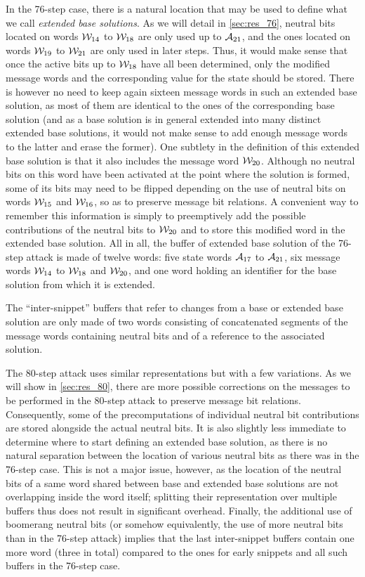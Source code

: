 In the 76-step case, there is a natural location that may be used to define what we call \emph{extended base solutions}. As we will detail in
\autoref{sec:res_76}, neutral bits located on words $\mathcal{W}_{14}$ to $\mathcal{W}_{18}$ are only used up to $\mathcal{A}_{21}$, and the ones located
on words $\mathcal{W}_{19}$ to $\mathcal{W}_{21}$ are only used in later steps. Thus, it would make sense that once the active bits up to
$\mathcal{W}_{18}$ have all been determined, only the modified message words and the corresponding value for the state should be stored. There is
however no need to keep again sixteen message words in such an extended base solution, as most of them are identical to the ones of the corresponding
base solution (and as a base solution is in general extended into many distinct extended base solutions, it would not make sense to \eg add enough
message words to the latter and erase the former). One subtlety in the definition of this extended base solution is that
it also includes the message word $\mathcal{W}_{20}$. Although no neutral bits on this word
have been activated at the point where the solution is
formed, some of its bits may need to be flipped depending on the use of neutral bits on words $\mathcal{W}_{15}$ and $\mathcal{W}_{16}$, so as to
preserve message bit relations. A convenient way to remember this information is simply to preemptively add the possible contributions of the neutral
bits to $\mathcal{W}_{20}$ and to store this modified word in the extended base solution.
All in all, the buffer of extended base solution of the 76-step attack is made of twelve words: five state words $\mathcal{A}_{17}$ to $\mathcal{A}_{21}$,
six message words $\mathcal{W}_{14}$ to $\mathcal{W}_{18}$ and $\mathcal{W}_{20}$, and one word holding an identifier for the base solution from which
it is extended.

The ``inter-snippet'' buffers that refer to changes from a base or extended base solution are only made of two words consisting of concatenated
segments of the message words containing neutral bits and of a reference to the associated solution.

The 80-step attack uses similar representations but with a few variations. As we will show in \autoref{sec:res_80}, there are
more possible corrections on the messages to be performed in the 80-step attack to preserve message bit relations. Consequently, some of the precomputations of
individual neutral bit contributions are stored alongside the actual neutral bits. It is also slightly less immediate to determine where to
start defining an extended base solution, as there is no natural separation between the location of various neutral bits as there was in
the 76-step case. This is not a major issue, however, as the location of the neutral bits of a same word shared between base and extended base solutions
are not overlapping inside the word itself; splitting their representation over multiple buffers thus does not result in significant overhead.
Finally, the additional use of boomerang neutral bits (or somehow equivalently, the use of more neutral bits than in the 76-step attack)
implies that the last inter-snippet buffers contain one more word (\ie three in total) compared to the ones for early snippets and all such buffers
in the 76-step case.

